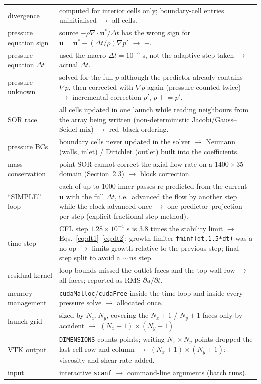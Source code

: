 {\begin{longtable}{p{3.5cm}p{11.7cm}}
divergence & computed for interior cells only; boundary-cell entries uninitialised $\rightarrow$ all cells.\\
pressure equation sign & source $-\rho\nabla\cdot\mathbf{u}^*/\Delta t$ has the wrong sign for $\mathbf{u}=\mathbf{u}^*-(\Delta t/\rho)\nabla p'$ $\rightarrow$ $+$.\\
pressure equation $\Delta t$ & used the macro $\Delta t=10^{-5}$ s, not the adaptive step taken $\rightarrow$ actual $\Delta t$.\\
pressure unknown & solved for the full $p$ although the predictor already contains $\nabla p$, then corrected with $\nabla p$ again (pressure counted twice) $\rightarrow$ incremental correction $p'$, $p\mathrel{+}=p'$.\\
SOR race & all cells updated in one launch while reading neighbours from the array being written (non-deterministic Jacobi/Gauss--Seidel mix) $\rightarrow$ red--black ordering.\\
pressure BCs & boundary cells never updated in the solver $\rightarrow$ Neumann (walls, inlet) / Dirichlet (outlet) built into the coefficients.\\
mass conservation & point SOR cannot correct the axial flow rate on a $1400\times35$ domain (Section~2.3) $\rightarrow$ block correction.\\
``SIMPLE'' loop & each of up to 1000 inner passes re-predicted from the current $\mathbf{u}$ with the full $\Delta t$, i.e.\ advanced the flow by another step while the clock advanced once $\rightarrow$ one predictor--projection per step (explicit fractional-step method).\\
time step & CFL step $1.28\times10^{-4}$ s is 3.8 times the stability limit $\rightarrow$ Eqs.~\eqref{eq:dt1}--\eqref{eq:dt2}; growth limiter \texttt{fminf(dt,1.5*dt)} was a no-op $\rightarrow$ limits growth relative to the previous step; final step split to avoid a $\sim$\,ns step.\\
residual kernel & loop bounds missed the outlet faces and the top wall row $\rightarrow$ all faces; reported as RMS $\partial u/\partial t$.\\
memory management & \texttt{cudaMalloc}/\texttt{cudaFree} inside the time loop and inside every pressure solve $\rightarrow$ allocated once.\\
launch grid & sized by $N_x,N_y$, covering the $N_x+1$ / $N_y+1$ faces only by accident $\rightarrow$ $(N_x+1)\times(N_y+1)$.\\
VTK output & \texttt{DIMENSIONS} counts points; writing $N_x\times N_y$ points dropped the last cell row and column $\rightarrow$ $(N_x+1)\times(N_y+1)$; viscosity and shear rate added.\\
input & interactive \texttt{scanf} $\rightarrow$ command-line arguments (batch runs).\\\bottomrule
\end{longtable}}

